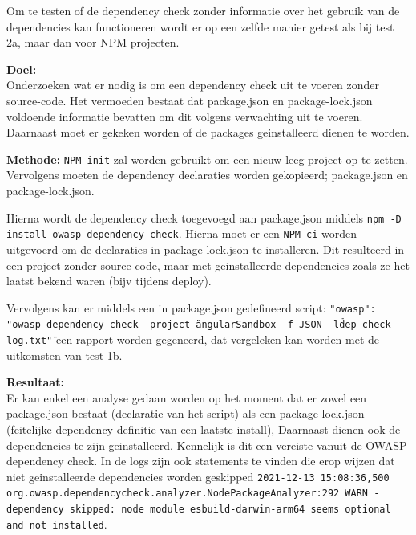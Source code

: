 Om te testen of de dependency check zonder informatie over het gebruik van de dependencies kan functioneren wordt er op een zelfde manier getest als bij test 2a, maar dan voor NPM projecten.

\textbf{Doel:}\\ Onderzoeken wat er nodig is om een dependency check uit te voeren zonder source-code. Het vermoeden bestaat dat package.json en package-lock.json voldoende informatie bevatten om dit volgens verwachting uit te voeren. Daarnaast moet er gekeken worden of de packages geinstalleerd dienen te worden.

\textbf{Methode:}
\texttt{NPM init} zal worden gebruikt om een nieuw leeg project op te zetten. Vervolgens moeten de dependency declaraties worden gekopieerd; package.json en package-lock.json.

Hierna wordt de dependency check toegevoegd aan package.json middels \texttt{npm -D install owasp-dependency-check}. Hierna moet er een \texttt{NPM ci} worden uitgevoerd om de declaraties in package-lock.json te installeren. Dit resulteerd in een project zonder source-code, maar met geinstalleerde dependencies zoals ze het laatst bekend waren (bijv tijdens deploy).

Vervolgens kan er middels een in package.json gedefineerd script: \texttt{"owasp": "owasp-dependency-check --project \" angularSandbox \" -f JSON -l\"dep-check-log.txt\" "}%
een rapport worden gegeneerd, dat vergeleken kan worden met de uitkomsten van test 1b.

\textbf{Resultaat:}\\
Er kan enkel een analyse gedaan worden op het moment dat er zowel een package.json bestaat (declaratie van het script) als een package-lock.json (feitelijke dependency definitie van een laatste install), Daarnaast dienen ook de dependencies te zijn geinstalleerd. Kennelijk is dit een vereiste vanuit de OWASP dependency check. In de logs zijn ook statements te vinden die erop wijzen dat niet geinstalleerde dependencies worden geskipped
\texttt{2021-12-13 15:08:36,500 org.owasp.dependencycheck.analyzer.NodePackageAnalyzer:292
WARN  - dependency skipped: node module esbuild-darwin-arm64 seems optional and not installed}.


